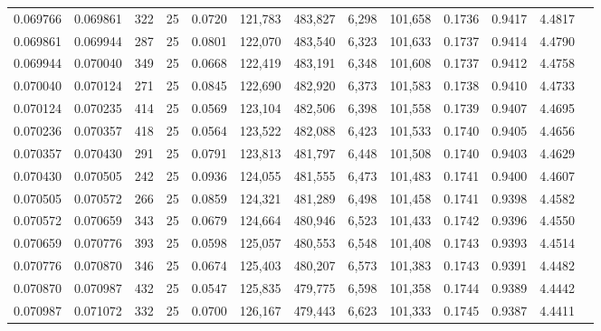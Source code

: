 \begin{tabular}{rrrrrrrrrrrrr}
0.069766 & 0.069861 &   322 &  25 &                                     0.0720 & 121,783 & 483,827 &   6,298 & 101,658 & 0.1736 & 0.9417 & 4.4817 \\
0.069861 & 0.069944 &   287 &  25 &                                     0.0801 & 122,070 & 483,540 &   6,323 & 101,633 & 0.1737 & 0.9414 & 4.4790 \\
0.069944 & 0.070040 &   349 &  25 &                                     0.0668 & 122,419 & 483,191 &   6,348 & 101,608 & 0.1737 & 0.9412 & 4.4758 \\
0.070040 & 0.070124 &   271 &  25 &                                     0.0845 & 122,690 & 482,920 &   6,373 & 101,583 & 0.1738 & 0.9410 & 4.4733 \\
0.070124 & 0.070235 &   414 &  25 &                                     0.0569 & 123,104 & 482,506 &   6,398 & 101,558 & 0.1739 & 0.9407 & 4.4695 \\
0.070236 & 0.070357 &   418 &  25 &                                     0.0564 & 123,522 & 482,088 &   6,423 & 101,533 & 0.1740 & 0.9405 & 4.4656 \\
0.070357 & 0.070430 &   291 &  25 &                                     0.0791 & 123,813 & 481,797 &   6,448 & 101,508 & 0.1740 & 0.9403 & 4.4629 \\
0.070430 & 0.070505 &   242 &  25 &                                     0.0936 & 124,055 & 481,555 &   6,473 & 101,483 & 0.1741 & 0.9400 & 4.4607 \\
0.070505 & 0.070572 &   266 &  25 &                                     0.0859 & 124,321 & 481,289 &   6,498 & 101,458 & 0.1741 & 0.9398 & 4.4582 \\
0.070572 & 0.070659 &   343 &  25 &                                     0.0679 & 124,664 & 480,946 &   6,523 & 101,433 & 0.1742 & 0.9396 & 4.4550 \\
0.070659 & 0.070776 &   393 &  25 &                                     0.0598 & 125,057 & 480,553 &   6,548 & 101,408 & 0.1743 & 0.9393 & 4.4514 \\
0.070776 & 0.070870 &   346 &  25 &                                     0.0674 & 125,403 & 480,207 &   6,573 & 101,383 & 0.1743 & 0.9391 & 4.4482 \\
0.070870 & 0.070987 &   432 &  25 &                                     0.0547 & 125,835 & 479,775 &   6,598 & 101,358 & 0.1744 & 0.9389 & 4.4442 \\
0.070987 & 0.071072 &   332 &  25 &                                     0.0700 & 126,167 & 479,443 &   6,623 & 101,333 & 0.1745 & 0.9387 & 4.4411 \\

\end{tabular}
